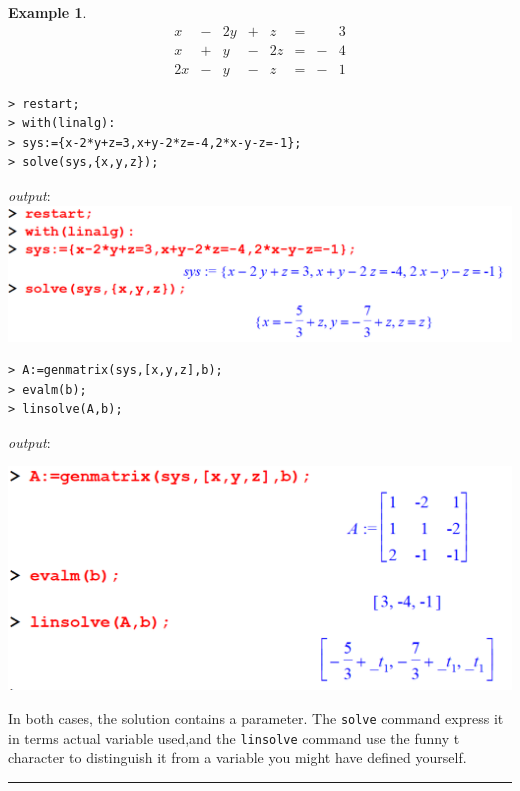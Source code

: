 \documentclass[
]{book}
\theoremstyle{definition}
\theoremstyle{definition}
\newtheorem{example}{Example}[chapter]
\theoremstyle{definition}
\theoremstyle{definition}
\theoremstyle{remark}
\begin{document}
\begin{example}
\protect\hypertarget{exm:unnamed-chunk-1}{}\label{exm:unnamed-chunk-1}\[
\begin{array}{ccccccccc}
x &-& 2y&+& z &=& &3\\
x &+& y &-& 2z&=&-&4\\
2x&-& y &-& z &=&-&1  
\end{array}
\]
\end{example}

\begin{verbatim}
> restart;
> with(linalg):
> sys:={x-2*y+z=3,x+y-2*z=-4,2*x-y-z=-1};
> solve(sys,{x,y,z});
\end{verbatim}

\emph{output}:
\includegraphics{figures/Lessson 5/fig9.png}

\begin{verbatim}
> A:=genmatrix(sys,[x,y,z],b);
> evalm(b);
> linsolve(A,b);
\end{verbatim}

\emph{output}:

\includegraphics{figures/Lessson 5/fig10.png}

In both cases, the solution contains a parameter.
The \texttt{solve} command express it in terms actual variable used,and the \texttt{linsolve} command use the funny t character to distinguish it from a variable you might have defined yourself.

\begin{center}\rule{0.5\linewidth}{0.5pt}\end{center}
\end{document}
